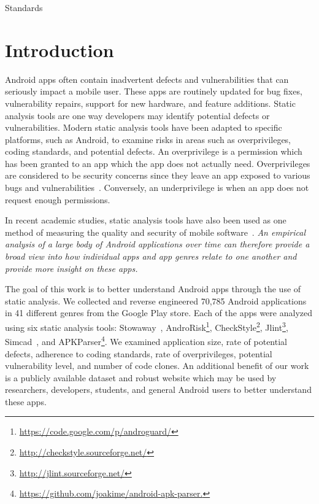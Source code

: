 \documentclass{sig-alternate}
\begin{document}
 Standards


\section{Introduction}


Android apps often contain inadvertent defects and vulnerabilities that can seriously impact a mobile user. These apps are routinely updated for bug fixes, vulnerability repairs, support for new hardware, and feature additions. Static analysis tools are one way developers may identify potential defects or vulnerabilities. Modern static analysis tools have been adapted to specific platforms, such as Android, to examine risks in areas such as overprivileges, coding standards, and potential defects. An overprivilege is a permission which has been granted to an app which the app does not actually need. Overprivileges are considered to be security concerns since they leave an app exposed to various bugs and vulnerabilities~\cite{Felt:2011:APD:2046707.2046779}. Conversely, an underprivilege is when an app does not request enough permissions.


In recent academic studies, static analysis tools have also been used as one method of measuring the quality and security of mobile software~\cite{Felt:2011:APD:2046707.2046779,Vidas11curbingandroid,Lee_2013}. \emph{An empirical analysis of a large body of Android applications over time can therefore provide a broad view into how individual apps and app genres relate to one another and provide more insight on these apps.}

The goal of this work is to better understand Android apps through the use of static analysis. We collected and reverse engineered 70,785 Android applications in 41 different genres from the Google Play store. Each of the apps were analyzed using six static analysis tools: Stowaway~\cite{Felt:2011:APD:2046707.2046779}, AndroRisk\footnote{\url{https://code.google.com/p/androguard/}}, CheckStyle\footnote{\url{http://checkstyle.sourceforge.net/}}, Jlint\footnote{\url{http://jlint.sourceforge.net/}}, Simcad~\cite{6613857}, and APKParser\footnote{\url{https://github.com/joakime/android-apk-parser.}}. We examined application size, rate of potential defects, adherence to coding standards, rate of overprivileges, potential vulnerability level, and number of code clones. An additional benefit of our work is a publicly available dataset and robust website which may be used by researchers, developers, students, and general Android users to better understand these apps.
\end{document}
